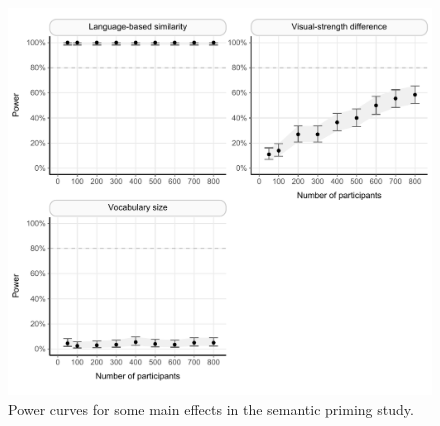 \documentclass[
  12pt,
  man,floatsintext]{apa7}
\begin{document}
\begin{figure}

{\centering \includegraphics[width=1\linewidth]{../semanticpriming/power_analysis/plots/semanticpriming_powercurve_plots_1_2_3} 

}

\caption{Power curves for some main effects in the semantic priming study.}\label{fig:semanticpriming-powercurve-plots-1-2-3}
\end{figure}
\end{document}
